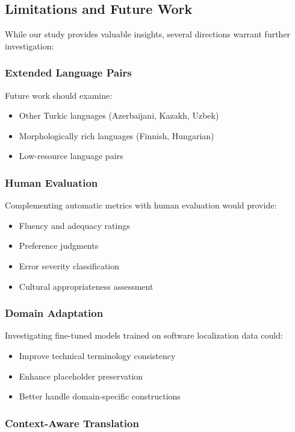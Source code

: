 \subsection{Limitations and Future Work}

While our study provides valuable insights, several directions warrant further investigation:

\subsubsection{Extended Language Pairs}

Future work should examine:
\begin{itemize}
    \item Other Turkic languages (Azerbaijani, Kazakh, Uzbek)
    \item Morphologically rich languages (Finnish, Hungarian)
    \item Low-resource language pairs
\end{itemize}

\subsubsection{Human Evaluation}

Complementing automatic metrics with human evaluation would provide:
\begin{itemize}
    \item Fluency and adequacy ratings
    \item Preference judgments
    \item Error severity classification
    \item Cultural appropriateness assessment
\end{itemize}

\subsubsection{Domain Adaptation}

Investigating fine-tuned models trained on software localization data could:
\begin{itemize}
    \item Improve technical terminology consistency
    \item Enhance placeholder preservation
    \item Better handle domain-specific constructions
\end{itemize}

\subsubsection{Context-Aware Translation}

